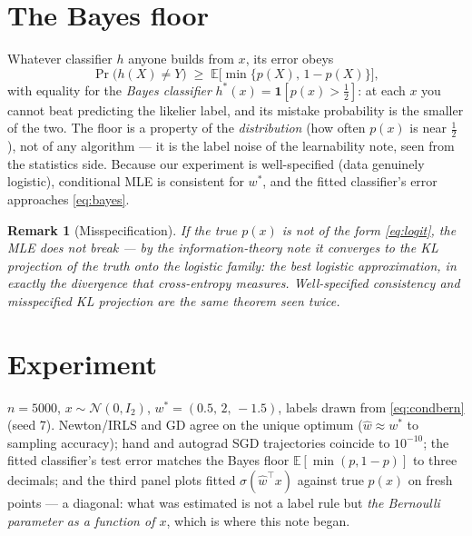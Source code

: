 \documentclass[11pt]{article}
\newtheorem{remark}{Remark}
\newcommand{\sig}{\sigma}
\begin{document}
\section{The Bayes floor}

Whatever classifier $h$ anyone builds from $x$, its error obeys
\begin{equation}
  \Pr\bigl(h(X) \ne Y\bigr)
  \;\ge\;
  \mathbb{E}\bigl[\min\{p(X),\, 1 - p(X)\}\bigr],
  \label{eq:bayes}
\end{equation}
with equality for the \emph{Bayes classifier}
$h^\ast(x) = \mathbf{1}[p(x) > \tfrac12]$: at each $x$ you cannot beat
predicting the likelier label, and its mistake probability is the smaller
of the two. The floor is a property of the \emph{distribution} (how often
$p(x)$ is near $\tfrac12$), not of any algorithm --- it is the label
noise of the learnability note, seen from the statistics side. Because
our experiment is well-specified (data genuinely logistic), conditional
MLE is consistent for $w^\ast$, and the fitted classifier's error
approaches \eqref{eq:bayes}.

\begin{remark}[Misspecification]
If the true $p(x)$ is \emph{not} of the form \eqref{eq:logit}, the MLE
does not break --- by the information-theory note it converges to the KL
projection of the truth onto the logistic family: the best logistic
approximation, in exactly the divergence that cross-entropy measures.
Well-specified consistency and misspecified KL projection are the same
theorem seen twice.
\end{remark}

\section{Experiment}

$n = 5000$, $x \sim \mathcal{N}(0, I_2)$, $w^\ast = (0.5,\, 2,\, -1.5)$,
labels drawn from \eqref{eq:condbern} (seed 7). Newton/IRLS and GD agree
on the unique optimum ($\hat w \approx w^\ast$ to sampling accuracy);
hand and autograd SGD trajectories coincide to $10^{-10}$; the fitted
classifier's test error matches the Bayes floor
$\mathbb{E}[\min(p, 1-p)]$ to three decimals; and the third panel plots
fitted $\sig(\hat w^\top x)$ against true $p(x)$ on fresh points ---
a diagonal: what was estimated is not a label rule but \emph{the Bernoulli
parameter as a function of $x$}, which is where this note began.
\end{document}
